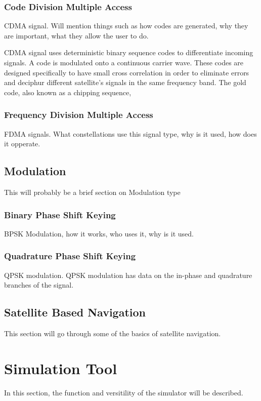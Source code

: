 \documentclass[12pt]{report}
\begin{document}
\subsection{Code Division Multiple Access}
CDMA signal. Will mention things such as how codes are generated, why they are important, what they allow the user to do.

CDMA signal uses deterministic binary sequence codes to differentiate incoming signals. A code is modulated onto a continuous carrier wave. These codes are designed specifically to have small cross correlation in order to eliminate errors and deciphur different satellite's signals in the same frequency band. The gold code, also known as a chipping sequence, 

\subsection{Frequency Division Multiple Access}
FDMA signals. What constellations use this signal type, why is it used, how does it opperate. 

\section{Modulation}
This will probably be a brief section on Modulation type

\subsection{Binary Phase Shift Keying}

BPSK Modulation, how it works, who uses it, why is it used.

\subsection{Quadrature Phase Shift Keying}

QPSK modulation. QPSK modulation has data on the in-phase and quadrature branches of the signal.

\section{Satellite Based Navigation}
This section will go through some of the basics of satellite navigation. 

\chapter {Simulation Tool}
In this section, the function and versitility of the simulator will be described.
\end{document}
